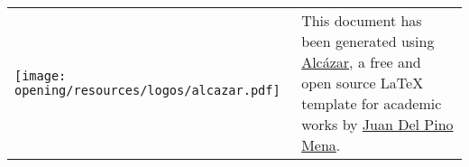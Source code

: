 
\begingroup

    \setlength\tabcolsep{0pt}
    \renewcommand*{\arraystretch}{1.4}
    \renewcommand{\baselinestretch}{1}\footnotesize  %
    
    \noindent
    \begin{tabular}{m{3.5cm} m{11.5cm}}
        \texttt{[image: opening/resources/logos/alcazar.pdf]} & 
        \noindent This document has been generated using {\href{https://github.com/dpmj/alcazar}{Alcázar}}, a free and open source {\LaTeX} template for academic works by \href{https://www.linkedin.com/in/dpmj/}{Juan Del Pino Mena}. \\
    \end{tabular}

\endgroup


